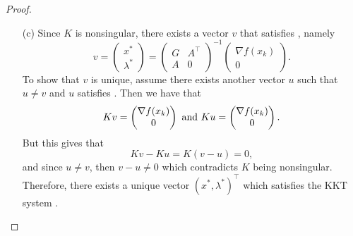 \documentclass[12pt]{report}
\begin{document}
\begin{problem}
\begin{proof}
\begin{enumerate}
    \item [(c)]
    Since $K$ is nonsingular, there exists a vector $v$ that satisfies , namely
    \begin{equation}
        v = \begin{pmatrix}
            x^*\\\lambda^*
        \end{pmatrix}= \begin{pmatrix}
            G & A^\top\\ A & 0
        \end{pmatrix}^{-1}\begin{pmatrix}
            \nabla f(x_k) \\ 0
        \end{pmatrix}.
    \end{equation}
    To show that $v$ is unique, assume there exists another vector $u$ such that $u \neq v$ and $u$ satisfies . Then we have that
    \begin{equation*}
        Kv = \begin{pmatrix}
            \nabla f(x_k) \\ 0
        \end{pmatrix} {~\text{and}~} Ku = \begin{pmatrix}
            \nabla f(x_k) \\ 0
        \end{pmatrix}.
    \end{equation*}
    But this gives that
    \begin{equation*}
        Kv - Ku = K(v - u) = 0,
    \end{equation*}
    and since $u \neq v$, then $v - u \neq 0$ which contradicts $K$ being nonsingular. Therefore, there exists a unique vector $(x^*, \lambda^*)^\top$ which satisfies the KKT system . 
\end{enumerate}

\end{proof}
\end{problem}




\end{document}
